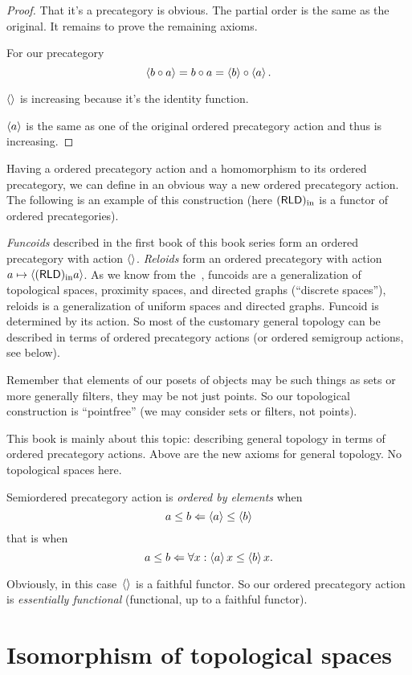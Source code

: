\begin{proof}
That it's a precategory is obvious. The partial order is the same as the original. It remains to prove the remaining axioms.

For our precategory
\[ \left\langle b\circ a\right\rangle = b\circ a=\left\langle b\right\rangle\circ \left\langle a\right\rangle. \]

$\left\langle \right\rangle$ is increasing because it's the identity function.

$\left\langle a\right\rangle$ is the same as one of the original ordered precategory action and thus is increasing.
\end{proof}

Having a ordered precategory action and a homomorphism to its ordered precategory, we can define in an obvious way a new ordered precategory action. The following is an example of this construction (here $(\mathsf{RLD})_{\mathrm{in}}$ is a functor of ordered precategories).

\emph{Funcoids} described in the first book of this book series form an ordered precategory with action $\left\langle \right\rangle$. \emph{Reloids} form an ordered precategory with action $a\mapsto\left\langle (\mathsf{RLD})_{\mathrm{in}} a\right\rangle$.
As we know from the~\cite{volume-1}, funcoids are a generalization of topological spaces, proximity spaces, and directed graphs (``discrete spaces''), reloids is a generalization of uniform spaces and directed graphs. Funcoid is determined by its action. So most of the customary general topology can be described in terms of ordered precategory actions (or ordered semigroup actions, see below).

Remember that elements of our posets of objects may be such things as sets or more generally filters, they may be not just points. So our topological construction is ``pointfree'' (we may consider sets or filters, not points).

This book is mainly about this topic: describing general topology in terms of ordered precategory actions. Above are the new axioms for general topology. No topological spaces here.

Semiordered precategory action is \emph{ordered by elements} when \[ a\leq b \Leftarrow \left\langle a\right\rangle\leq \left\langle b\right\rangle \] that is when \[ a\leq b \Leftarrow \forall x:\left\langle a\right\rangle x\leq\left\langle b\right\rangle x. \]

Obviously, in this case~$\left\langle \right\rangle$ is a faithful functor. So our ordered precategory action is \emph{essentially functional} (functional, up to a faithful functor).

\chapter{Isomorphism of topological spaces}

